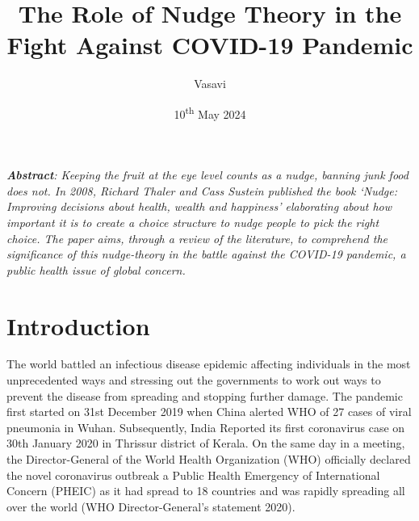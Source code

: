 \documentclass[12pt, a4paper]{article}
\title {The Role of Nudge Theory in the Fight Against COVID-19 Pandemic}
\author{Vasavi}
\date{10\textsuperscript{th} May 2024}
\begin{document}
\maketitle

\vspace{75mm}
\textit{\textbf{Abstract}: Keeping the fruit at the eye level  counts as a nudge, banning junk food does not. In 2008, Richard Thaler and Cass Sustein published the book ‘Nudge: Improving decisions about health, wealth and happiness’ elaborating about how important it is to create a choice structure to nudge people to pick the right choice. The paper aims, through a review of the literature, to comprehend the significance of this nudge-theory in the battle against the COVID-19 pandemic, a public health issue of global concern.}

\break

\section{\centering Introduction}
The world battled an infectious disease epidemic affecting individuals in the most unprecedented ways and stressing out the governments to work out ways to prevent the disease from spreading and stopping further damage. The pandemic first started on 31st December 2019 when China alerted WHO of 27 cases of viral pneumonia in Wuhan. Subsequently, India Reported its first coronavirus case on 30th January 2020 in Thrissur district of Kerala. On the same day in a meeting, the Director-General of the World Health Organization (WHO) officially declared the novel coronavirus outbreak a Public Health Emergency of International Concern (PHEIC) as it had spread to 18 countries and was rapidly spreading all over the world (WHO Director-General's statement 2020).\\
\end{document}
